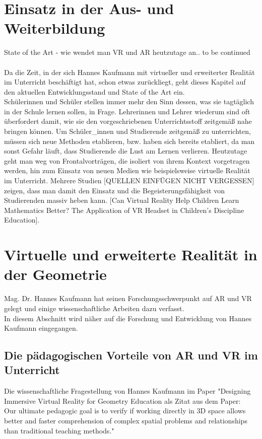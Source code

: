 \documentclass[deutsch]{llncs}
\begin{document}
\section{Einsatz in der Aus- und Weiterbildung}
\label{sec:typo}
State of the Art - wie wendet man VR und AR heutzutage an.. to be continued \\
\noindent \\
Da die Zeit, in der sich Hannes Kaufmann mit virtueller und erweiterter Realität im Unterricht beschäftigt hat, schon etwas zurückliegt, geht dieses Kapitel auf den aktuellen Entwicklungsstand und State of the Art ein. \\
Schülerinnen und Schüler stellen immer mehr den Sinn dessen, was sie tagtäglich in der Schule lernen sollen, in Frage. Lehrerinnen und Lehrer wiederum sind oft überfordert damit, wie sie den vorgeschriebenen Unterrichtsstoff zeitgemäß nahe bringen können. Um Schüler\_innen und Studierende zeitgemäß zu unterrichten, müssen sich neue Methoden etablieren, bzw. haben sich bereits etabliert, da man sonst Gefahr läuft, dass Studierende die Lust am Lernen verlieren. Heutzutage geht man weg von Frontalvorträgen, die isoliert von ihrem Kontext vorgetragen werden, hin zum Einsatz von neuen Medien wie beispielsweise virtuelle Realität im Unterricht. Mehrere Studien [QUELLEN EINFÜGEN NICHT VERGESSEN] zeigen, dass man damit den Einsatz und die Begeisterungsfähigkeit von Studierenden massiv heben kann.
\cite{2}
[Can Virtual Reality Help Children Learn Mathematics Better? The Application of VR Headset in Children’s Discipline Education].

\section{Virtuelle und erweiterte Realität in der Geometrie}
\label{sec:typo}
Mag. Dr. Hannes Kaufmann hat seinen Forschungsschwerpunkt auf AR und VR gelegt und einige wissenschaftliche Arbeiten dazu verfasst. \\
In diesem Abschnitt wird näher auf die Forschung und Entwicklung von Hannes Kaufmann eingegangen. 

\subsection{Die pädagogischen Vorteile von AR und VR im Unterricht}
\label{subsec:}
Die wissenschaftliche Fragestellung von Hannes Kaufmann im Paper "Designing Immersive Virtual Reality for Geometry Education als Zitat aus dem Paper: \\
Our ultimate pedagogic goal is to verify if working directly in 3D space allows better and faster comprehension of complex spatial problems and relationships than traditional teaching methods." \cite{3} %
\end{document}
